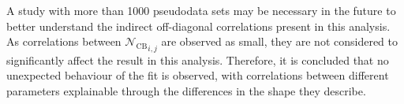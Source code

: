 A study with more than 1000 pseudodata sets may be necessary in the future to better understand the indirect off-diagonal correlations present in this analysis.
As correlations between ${\mathcal{N}_{\mathrm{CB}}}_{i,j}$ are observed as small, they are not considered to significantly affect the result in this analysis.
Therefore, it is concluded that no unexpected behaviour of the fit is observed, with correlations between different parameters explainable through the differences in the \PDF shape they describe.